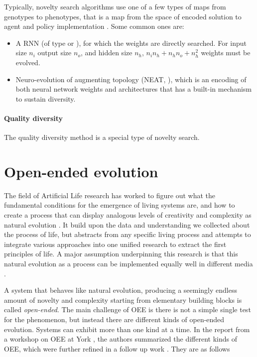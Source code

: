 Typically, novelty search algorithms use one of a few types of maps from
genotypes to phenotypes, that is a map from the space of encoded solution to
agent and policy implementation
\parencite{mouretEncouragingBehavioralDiversity2012}. Some common ones are:
\begin{itemize}
  \item A \ac{RNN} (of type \cite{elmanFindingStructureTime1990} or
        \cite{jordanSerialOrderParallel1997}), for which the weights are
        directly searched. For input size $n_{i}$ output size $n_{o}$, and
        hidden size $n_{h}$, $n_{i}n_{h} + n_{h}n_{o} + n_{h}^{2}$ weights must
        be evolved.
  \item Neuro-evolution of augmenting topology (NEAT,
        \cite{stanleyEvolvingNeuralNetworks2002}), which is an encoding of both
        neural network weights and architectures that has a built-in mechanism
        to sustain diversity.
\end{itemize}

\paragraph{Quality diversity}
The quality diversity method is a special type of novelty search.

\section{Open-ended evolution\label{sec:open-ended-evolution-1}}
The field of Artificial Life research has worked to figure out what the
fundamental conditions for the emergence of living systems are, and how to
create a process that can display analogous levels of creativity and complexity
as natural evolution \parencite{eigenHypercycle1979,
  langtonArtificialLifeProceedings1989, dysonOriginsLife1999,
  stanleyWhyOpenEndednessMatters2019, packardOverviewOpenEndedEvolution2019,
  sorosOpenendednessLastGrand2017}. It build upon the data and understanding we
collected about the process of life, but abstracts from any specific living
process and attempts to integrate various approaches into one unified research
to extract the first principles of life. A major assumption underpinning this
research is that this natural evolution as a process can be implemented equally
well in different media \parencite{dennettDarwinDangerousIdea1996}.

A system that behaves like natural evolution, producing a seemingly endless
amount of novelty and complexity starting from elementary building blocks is
called \emph{open-ended}. The main challenge of \ac{OEE} is there is not a simple
single test for the phenomenon, but instead there are different kinds of
open-ended evolution. Systems can exhibit more than one kind at a time. In the
report from a workshop on \ac{OEE} at York
\parencite{taylorOpenEndedEvolutionPerspectives2016}, the authors summarized the
different kinds of \ac{OEE}, which were further refined in a follow up work
\parencite{packardOverviewOpenEndedEvolution2019}. They are as follows

